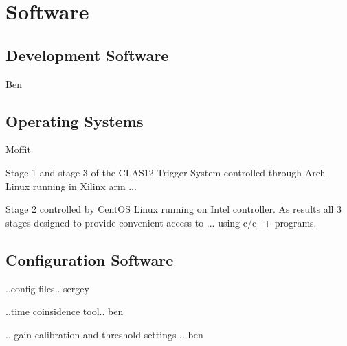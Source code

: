\section{Software}



\subsection{Development Software} Ben

\subsection{Operating Systems} Moffit

Stage 1 and stage 3 of the CLAS12 Trigger System controlled through Arch Linux running in Xilinx arm ...

Stage 2 controlled by CentOS Linux running on Intel controller. As results all 3 stages designed to provide convenient access to ...
using c/c++ programs.

\subsection{Configuration Software}

..config files.. sergey

..time coinsidence tool.. ben

.. gain calibration and threshold settings .. ben


